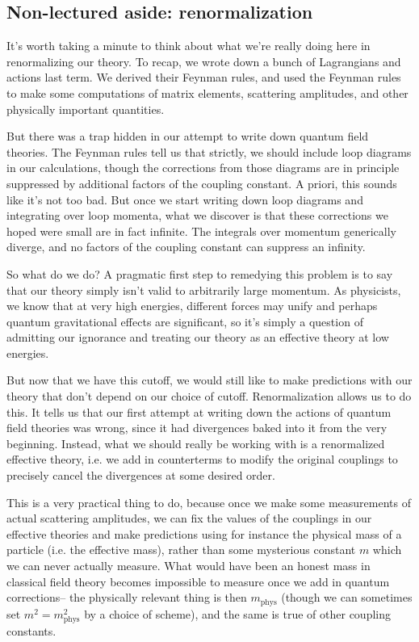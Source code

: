 \subsection*{Non-lectured aside: renormalization}

It's worth taking a minute to think about what we're really doing here in renormalizing our theory. To recap, we wrote down a bunch of Lagrangians and actions last term. We derived their Feynman rules, and used the Feynman rules to make some computations of matrix elements, scattering amplitudes, and other physically important quantities.

But there was a trap hidden in our attempt to write down quantum field theories. The Feynman rules tell us that strictly, we should include loop diagrams in our calculations, though the corrections from those diagrams are in principle suppressed by additional factors of the coupling constant. A priori, this sounds like it's not too bad. But once we start writing down loop diagrams and integrating over loop momenta, what we discover is that these corrections we hoped were small are in fact infinite. The integrals over momentum generically diverge, and no factors of the coupling constant can suppress an infinity.

So what do we do? A pragmatic first step to remedying this problem is to say that our theory simply isn't valid to arbitrarily large momentum. As physicists, we know that at very high energies, different forces may unify and perhaps quantum gravitational effects are significant, so it's simply a question of admitting our ignorance and treating our theory as an effective theory at low energies.

But now that we have this cutoff, we would still like to make predictions with our theory that don't depend on our choice of cutoff. Renormalization allows us to do this. It tells us that our first attempt at writing down the actions of quantum field theories was wrong, since it had divergences baked into it from the very beginning. Instead, what we should really be working with is a renormalized effective theory, i.e. we add in counterterms to modify the original couplings to precisely cancel the divergences at some desired order.

This is a very practical thing to do, because once we make some measurements of actual scattering amplitudes, we can fix the values of the couplings in our effective theories and make predictions using for instance the physical mass of a particle (i.e. the effective mass), rather than some mysterious constant $m$ which we can never actually measure. What would have been an honest mass in classical field theory becomes impossible to measure once we add in quantum corrections-- the physically relevant thing is then $m_{\text{phys}}$ (though we can sometimes set $m^2=m_{\text{phys}}^2$ by a choice of scheme), and the same is true of other coupling constants.